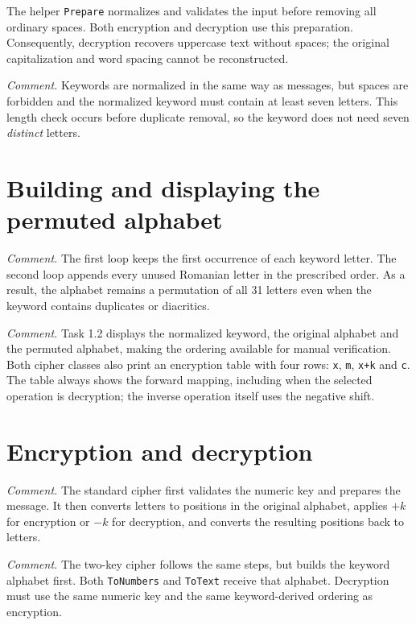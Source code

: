 \documentclass{tum_report}
\newcommand{\codepart}[3]{{\setstretch{1}}}
\begin{document}
\noindent The helper \texttt{Prepare} normalizes and validates the input
before removing all ordinary spaces. Both encryption and decryption use
this preparation. Consequently, decryption recovers uppercase text without
spaces; the original capitalization and word spacing cannot be reconstructed.

\codepart{50}{61}{4}
\noindent\textit{Comment.} Keywords are normalized in the same way as messages,
but spaces are forbidden and the normalized keyword must contain at least
seven letters. This length check occurs before duplicate removal, so the
keyword does not need seven \emph{distinct} letters.

\clearpage
\section{Building and displaying the permuted alphabet}
\codepart{185}{210}{4}
\noindent\textit{Comment.} The first loop keeps the first occurrence of each
keyword letter. The second loop appends every unused Romanian letter in
the prescribed order. As a result, the alphabet remains a permutation of
all 31 letters even when the keyword contains duplicates or diacritics.

\codepart{212}{223}{4}
\noindent\textit{Comment.} Task 1.2 displays the normalized keyword, the original
alphabet and the permuted alphabet, making the ordering available for manual
verification. Both cipher classes also print an encryption table with four
rows: \texttt{x}, \texttt{m}, \texttt{x+k} and \texttt{c}. The table always
shows the forward mapping, including when the selected operation is decryption;
the inverse operation itself uses the negative shift.

\clearpage
\section{Encryption and decryption}
\codepart{121}{143}{4}
\noindent\textit{Comment.} The standard cipher first validates the numeric key
and prepares the message. It then converts letters to positions in the
original alphabet, applies $+k$ for encryption or $-k$ for decryption, and
converts the resulting positions back to letters.

\codepart{159}{183}{4}
\noindent\textit{Comment.} The two-key cipher follows the same steps, but builds
the keyword alphabet first. Both \texttt{ToNumbers} and \texttt{ToText}
receive that alphabet. Decryption must use the same numeric key and the same
keyword-derived ordering as encryption.
\end{document}
